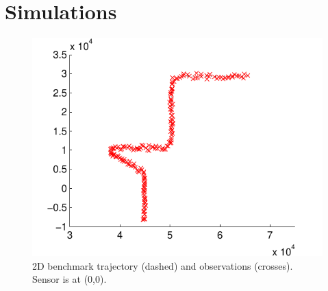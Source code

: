 \documentclass[conference]{IEEEtran}
\begin{document}
\section{Simulations}
%
\begin{figure}[!t]
\centering
\includegraphics[width=0.95\columnwidth]{images/benchmark_problem.pdf}
\caption{2D benchmark trajectory (dashed) and observations (crosses). Sensor is at (0,0).}
\label{fig:2D_ground_truth}
\end{figure}
\end{document}
